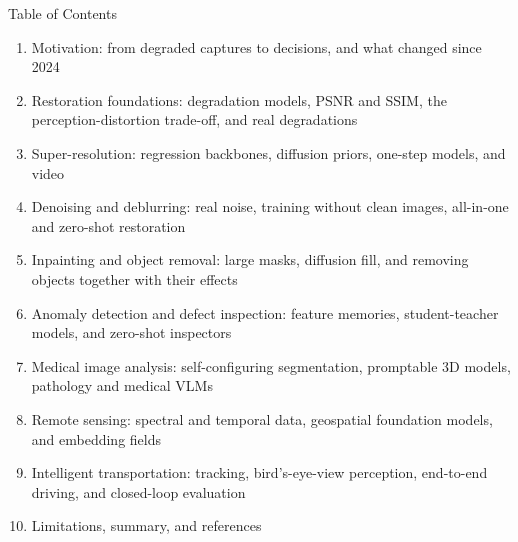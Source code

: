 \begin{frame}{Table of Contents}
  \begin{enumerate}\itemsep0.15em\footnotesize
    \item Motivation: from degraded captures to decisions, and what changed since 2024
    \item Restoration foundations: degradation models, PSNR and SSIM, the perception-distortion trade-off, and real degradations
    \item Super-resolution: regression backbones, diffusion priors, one-step models, and video
    \item Denoising and deblurring: real noise, training without clean images, all-in-one and zero-shot restoration
    \item Inpainting and object removal: large masks, diffusion fill, and removing objects together with their effects
    \item Anomaly detection and defect inspection: feature memories, student-teacher models, and zero-shot inspectors
    \item Medical image analysis: self-configuring segmentation, promptable 3D models, pathology and medical VLMs
    \item Remote sensing: spectral and temporal data, geospatial foundation models, and embedding fields
    \item Intelligent transportation: tracking, bird's-eye-view perception, end-to-end driving, and closed-loop evaluation
    \item Limitations, summary, and references
  \end{enumerate}
\end{frame}

